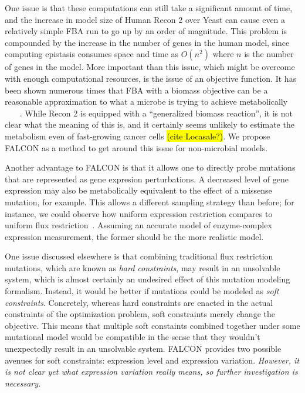 \documentclass[phd,tocprelim,draft]{cornell}
\begin{document}
One issue is that these computations can still take a significant
amount of time, and the increase in model size of Human Recon 2 over
Yeast can cause even a relatively simple FBA run to go up by an order
of magnitude.  This problem is compounded by the increase in the
number of genes in the human model, since computing epistasis consumes
space and time as $O(n^2)$ where $n$ is the number of genes in the
model. More important than this issue, which might be overcome with
enough computational resources, is the issue of an objective
function. It has been shown numerous times that FBA with a biomass
objective can be a reasonable approximation to what a microbe is
trying to achieve metabolically
~\cite{Schuetz2012}~\cite{Fong2004}~\cite{Varma1994} . While Recon 2
is equipped with a ``generalized biomass reaction'', it is not clear
what the meaning of this is, and it certainly seems unlikely to
estimate the metabolism even of fast-growing cancer cells \hl{(cite
  Locasale?)}. We propose FALCON as a method to get around this issue
for non-microbial models.

Another advantage to FALCON is that it allows one to directly probe
mutations that are represented as gene expresion perturbations. A
decreased level of gene expression may also be metabolically
equivalent to the effect of a missense mutation, for example. This
allows a different sampling strategy than before; for instance, we
could observe how uniform expression restriction compares to uniform
flux restriction~\cite{Xu2012}. Assuming an accurate model of
enzyme-complex expression measurement, the former should be the more
realistic model.

One issue discussed elsewhere is that combining traditional flux
restriction mutations, which are known as \emph{hard constraints}, may
result in an unsolvable system, which is almost certainly an undesired
effect of this mutation modeling formalism. Instead, it would be
better if mutations could be modeled as \emph{soft
  constraints}. Concretely, whereas hard constraints are enacted in
the actual constraints of the optimization problem, soft constraints
merely change the objective. This means that multiple soft constaints
combined together under some mutational model would be compatible in
the sense that they wouldn't unexpectedly result in an unsolvable
system. FALCON provides two possible avenues for soft constraints:
expression level and expression variation. \emph{However, it is not
  clear yet what expression variation really means, so further
  investigation is necessary.}
\end{document}
